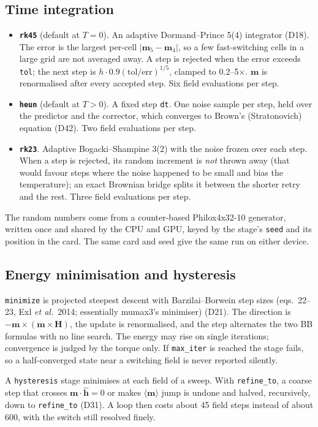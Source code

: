 \documentclass[10pt,a4paper]{article}
\newcommand{\code}[1]{\texttt{#1}}
\newcommand{\vm}{\mathbf{m}}
\newcommand{\vH}{\mathbf{H}}
\newcommand{\dec}[1]{\textcolor{comment}{\small(#1)}}
\begin{document}
\subsection{Time integration}
\begin{itemize}
  \item \textbf{\code{rk45}} (default at $T=0$). An adaptive Dormand--Prince 5(4) integrator \dec{D18}. The error is
        the largest per-cell $|\vm_5-\vm_4|$, so a few fast-switching cells in a large grid are not averaged away. A step
        is rejected when the error exceeds \code{tol}; the next step is $h\cdot0.9(\mathrm{tol}/\mathrm{err})^{1/5}$,
        clamped to 0.2--5$\times$. $\vm$ is renormalised after every accepted step. Six field evaluations per step.
  \item \textbf{\code{heun}} (default at $T>0$). A fixed step \code{dt}. One noise sample per step, held over the
        predictor and the corrector, which converges to Brown's (Stratonovich) equation \dec{D42}. Two field
        evaluations per step.
  \item \textbf{\code{rk23}}. Adaptive Bogacki--Shampine 3(2) with the noise frozen over each step. When a step is
        rejected, its random increment is \emph{not} thrown away (that would favour steps where the noise happened to be
        small and bias the temperature); an exact Brownian bridge splits it between the shorter retry and the rest.
        Three field evaluations per step.
\end{itemize}
The random numbers come from a counter-based Philox4x32-10 generator, written once and shared by the CPU and GPU, keyed
by the stage's \code{seed} and its position in the card. The same card and seed give the same run on either device.

\subsection{Energy minimisation and hysteresis}
\code{minimize} is projected steepest descent with Barzilai--Borwein step sizes (eqs.~22--23, Exl \emph{et al.}\ 2014;
essentially mumax3's minimiser) \dec{D21}. The direction is $-\vm\times(\vm\times\vH)$, the update is renormalised, and
the step alternates the two BB formulas with no line search. The energy may rise on single iterations; convergence is
judged by the torque only. If \code{max\_iter} is reached the stage fails, so a half-converged state near a switching
field is never reported silently.

A \code{hysteresis} stage minimises at each field of a sweep. With \code{refine\_to}, a coarse step that crosses
$\vm\cdot\hat{\mathbf{h}}=0$ or makes $\langle\vm\rangle$ jump is undone and halved, recursively, down to
\code{refine\_to} \dec{D31}. A loop then costs about 45 field steps instead of about 600, with the switch still resolved
finely.
\end{document}
